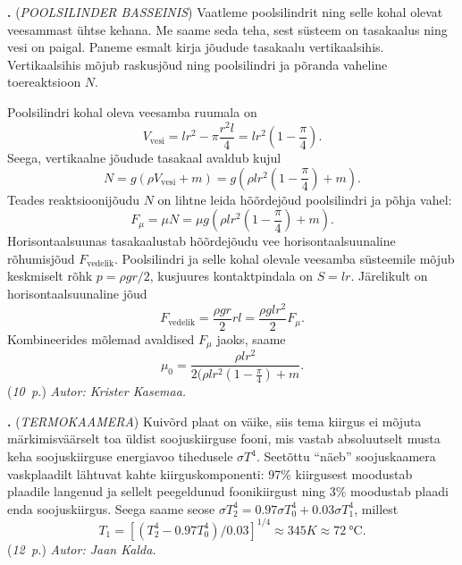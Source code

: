 \documentclass[12pt,a5paper]{article}
\newcommand{\numb}[1]{\vspace{5pt}\textbf{\large #1}}
\newcommand{\nimi}[1]{(\textsl{\small #1})}
\newcommand{\punktid}[1]{(\emph{#1~p.})}
\newcommand{\autor}[1]{\emph{ Autor: #1.}}
\newcounter{ylesanne}
\newcommand{\yl}[1]{\addtocounter{ylesanne}{1}\numb{\theylesanne.} \nimi{#1} \newblock{}}
\begin{document}
\yl{POOLSILINDER BASSEINIS}
Vaatleme poolsilindrit ning selle kohal olevat veesammast ühtse kehana. Me saame seda teha, sest süsteem on tasakaalus ning vesi on paigal.
Paneme esmalt kirja jõudude tasakaalu vertikaalsihis.
Vertikaalsihis mõjub raskusjõud ning poolsilindri ja põranda vaheline toereaktsioon $N$.

Poolsilindri kohal oleva veesamba ruumala on
\begin{equation*}
	V_{\mathrm{vesi}}=l r^2-\pi \frac{r^2 l}{4}=l r^2\left(1-\frac{\pi}{4}\right).
\end{equation*}
Seega, vertikaalne jõudude tasakaal avaldub kujul
\begin{equation*}
	N=g(\rho V_{\mathrm{vesi}} + m) = g\left(\rho l r^2\left(1-\frac{\pi}{4}\right) + m\right).
\end{equation*}
Teades reaktsioonijõudu $N$ on lihtne leida hõõrdejõud poolsilindri ja põhja vahel:
\begin{equation*}
	F_{\mu}=\mu N= \mu g \left(\rho l r^2\left(1-\frac{\pi}{4}\right) + m\right).
\end{equation*} 
Horisontaalsuunas tasakaalustab hõõrdejõudu vee horisontaalsuunaline rõhumisjõud $F_{\mathrm{vedelik}}$. Poolsilindri ja selle kohal olevale veesamba süsteemile mõjub keskmiselt rõhk $p = \rho gr/2$, kusjuures kontaktpindala on $S = lr$. Järelikult on horisontaalsuunaline jõud
\begin{equation*}
	F_{\mathrm{vedelik}}=\frac{\rho g r}{2}r l=\frac{\rho g l r^2}{2} F_{\mu}.
\end{equation*}
Kombineerides mõlemad avaldised $F_\mu$ jaoks, saame
\begin{equation*}
	\mu_0=\frac{\rho l r^2}{2(\rho l r^2(1-\frac{\pi}{4})+m}.
\end{equation*}
\punktid{10} \autor{Krister Kasemaa}


\yl{TERMOKAAMERA}
Kuivõrd plaat on väike, siis tema kiirgus ei mõjuta märkimisväärselt toa üldist soojuskiirguse fooni, mis vastab absoluutselt musta keha soojuskiirguse energiavoo tihedusele $\sigma T^4$. Seetõttu ``näeb'' soojuskaamera vaskplaadilt lähtuvat kahte kiirguskomponenti: 97\% kiirgusest moodustab plaadile langenud ja sellelt peegeldunud foonikiirgust ning 3\% moodustab plaadi enda soojuskiirgus. Seega saame seose $\sigma T_2^4= \num{0.97}\sigma T_0^4+\num{0.03}\sigma T_1^4$, millest 
$$T_1=[(T_2^4-\num{0.97}T_0^4)/\num{0.03}]^{1/4}\approx \SI {345}K\approx \SI{72}\celsius.$$
\punktid{12} \autor{Jaan Kalda}
\end{document}
